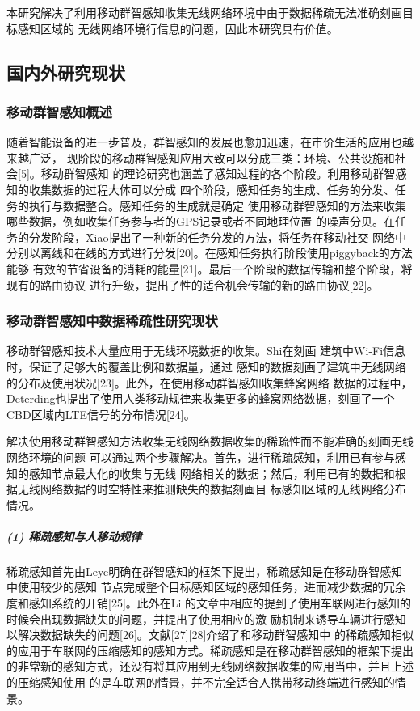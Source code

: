 \documentclass[UTF8]{ctexart}
\begin{document}
本研究解决了利用移动群智感知收集无线网络环境中由于数据稀疏无法准确刻画目标感知区域的
无线网络环境行信息的问题，因此本研究具有价值。

\subsection{国内外研究现状}
\subsubsection{移动群智感知概述}

随着智能设备的进一步普及，群智感知的发展也愈加迅速，在市价生活的应用也越来越广泛，
现阶段的移动群智感知应用大致可以分成三类：环境、公共设施和社会[5]。移动群智感知
的理论研究也涵盖了感知过程的各个阶段。利用移动群智感知的收集数据的过程大体可以分成
四个阶段，感知任务的生成、任务的分发、任务的执行与数据整合。感知任务的生成就是确定
使用移动群智感知的方法来收集哪些数据，例如收集任务参与者的GPS记录或者不同地理位置
的噪声分贝。在任务的分发阶段，Xiao提出了一种新的任务分发的方法，将任务在移动社交
网络中分别以离线和在线的方式进行分发[20]。在感知任务执行阶段使用piggyback的方法能够
有效的节省设备的消耗的能量[21]。最后一个阶段的数据传输和整个阶段，将现有的路由协议
进行升级，提出了性的适合机会传输的新的路由协议[22]。

\subsubsection{移动群智感知中数据稀疏性研究现状}

移动群智感知技术大量应用于无线环境数据的收集。Shi在刻画
建筑中Wi-Fi信息时，保证了足够大的覆盖比例和数据量，通过
感知的数据刻画了建筑中无线网络的分布及使用状况[23]。此外，在使用移动群智感知收集蜂窝网络
数据的过程中，Deterding也提出了使用人类移动规律来收集更多的蜂窝网络数据，刻画了一个
CBD区域内LTE信号的分布情况[24]。

解决使用移动群智感知方法收集无线网络数据收集的稀疏性而不能准确的刻画无线网络环境的问题
可以通过两个步骤解决。首先，进行稀疏感知，利用已有参与感知的感知节点最大化的收集与无线
网络相关的数据；然后，利用已有的数据和根据无线网络数据的时空特性来推测缺失的数据刻画目
标感知区域的无线网络分布情况。

\subparagraph{\textbf{(1) 稀疏感知与人移动规律}}

稀疏感知首先由Leye明确在群智感知的框架下提出，稀疏感知是在移动群智感知中使用较少的感知
节点完成整个目标感知区域的感知任务，进而减少数据的冗余度和感知系统的开销[25]。此外在Li
的文章中相应的提到了使用车联网进行感知的时候会出现数据缺失的问题，并提出了使用相应的激
励机制来诱导车辆进行感知以解决数据缺失的问题[26]。文献[27][28]介绍了和移动群智感知中
的稀疏感知相似的应用于车联网的压缩感知的感知方式。稀疏感知是在移动群智感知的框架下提出
的非常新的感知方式，还没有将其应用到无线网络数据收集的应用当中，并且上述的压缩感知使用
的是车联网的情景，并不完全适合人携带移动终端进行感知的情景。
\end{document}
